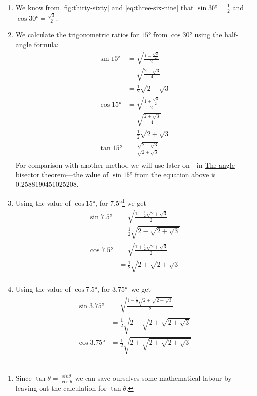 \documentclass[
  a4paper,
]{article}
\begin{document}
\begin{enumerate}
\item
  We know from \cref{fig:thirty-sixty} and \cref{eq:three-six-nine} that
  \(\sin 30° = \frac{1}{2}\) and \(\cos 30° = \frac{\sqrt{3}}{2}\).
\item
  We calculate the trigonometric ratios for \(15°\) from \(\cos 30°\)
  using the half-angle formula: \[
  \begin{aligned}
  \sin 15° &= \sqrt{\frac{1 - \frac{\sqrt{3}}{2}}{2}}\\
  &= \sqrt{\frac{2 - \sqrt{3}}{4}}\\
  &= \frac{1}{2}\sqrt{2 - \sqrt{3}}\\
  \cos 15° &= \sqrt{\frac{1 + \frac{\sqrt{3}}{2}}{2}}\\
  &= \sqrt{\frac{2 + \sqrt{3}}{4}}\\
  &= \frac{1}{2}\sqrt{2 + \sqrt{3}}\\
  \tan 15° &= \frac{\sqrt{2 - \sqrt{3}}}{\sqrt{2 + \sqrt{3}}}\\
  \end{aligned}
  \] For comparison with another method we will use later on---in
  \hyperref[the-angle-bisector-theorem]{The angle bisector
  theorem}---the value of \(\sin 15°\) from the equation above is
  0.2588190451025208.
\item
  Using the value of \(\cos 15°\), for \(7.5°\)\footnote{Since
    \(\tan\theta = \frac{sin\theta}{\cos\theta}\) we can save ourselves
    some mathematical labour by leaving out the calculation for
    \(\tan\theta\).} we get \[
  \begin{aligned}
  \sin 7.5° &= \sqrt{\frac{1 - \frac{1}{2}\sqrt{2 + \sqrt{3}}}{2}}\\
  &= \frac{1}{2}\sqrt{2 - \sqrt{2 + \sqrt{3}}}\\
  \cos 7.5° &= \sqrt{\frac{1 + \frac{1}{2}\sqrt{2 + \sqrt{3}}}{2}}\\
  &= \frac{1}{2}\sqrt{2 + \sqrt{2 + \sqrt{3}}}\\
  \end{aligned}
  \]
\item
  Using the value of \(\cos 7.5°\), for \(3.75°\), we get \[
  \begin{aligned}
  \sin 3.75° &= \sqrt{\frac{1 - \frac{1}{2}\sqrt{2 + \sqrt{2 + \sqrt{3}}}}{2}}\\
  &= \frac{1}{2}\sqrt{2 - \sqrt{2 + \sqrt{2 + \sqrt{3}}}}\\
  \cos 3.75° &= \frac{1}{2}\sqrt{2 + \sqrt{2 + \sqrt{2 + \sqrt{3}}}}\\

\end{aligned}\]
\end{enumerate}
\end{document}
